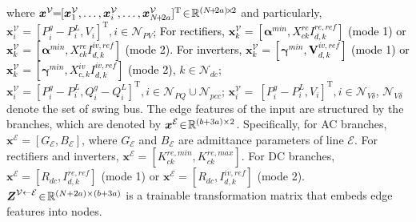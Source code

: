 \documentclass[lettersize,journal]{IEEEtran}
\begin{document}
where $\boldsymbol{x}^\mathcal{V}\! \!=\!\! [ \boldsymbol{x}^{\mathcal{V}}_1, \dots, \boldsymbol{x}^{\mathcal{V}}_i, \dots, \boldsymbol{x}^{\mathcal{V}}_{\textcolor{black}{N\!+\!2a}} ]^\mathrm{T} \! \in \! \mathbb{R}^{\textcolor{black}{(N\!+\!2a)} \! \times \! 2}$ and particularly, $ \boldsymbol{x}^{\mathcal{V}}_i \! = \! [ {P}^g_{i} \! - \! {P}^L_{i}, \! V_i ]^\mathrm{T}, i \! \in \! \mathcal{N}\!_{PV} $; \textcolor{black}{ For rectifiers, $\boldsymbol{x}_k^{\mathcal{V}} \! = \!  [\boldsymbol{\alpha}^{min},  {X}_{c k}^{re} {I}_{d,k}^{re,ref}  ]$ (mode 1) or $\boldsymbol{x}_k^{\mathcal{V}}\! = \! [\boldsymbol{\alpha}^{min}, {X}_{ck}^{re} {I}_{d,k}^{iv,ref}]$ (mode 2). For inverters, $\boldsymbol{x}_k^{\mathcal{V}} \! = \! [\boldsymbol{\gamma}^{min}, \boldsymbol{V}_{d,k}^{iv,ref} ]$ (mode 1) or $\boldsymbol{x}_k^{\mathcal{V}} \! = \! [\boldsymbol{\gamma}^{min}, {X}_{c,k}^{iv} {I}_{d,k}^{iv,ref}  ]$ (mode 2), } $k \! \in \! \mathcal{N}_{dc} $; $\boldsymbol{x}^{\mathcal{V}}_i= [{P}^g_{i}-{P}^L_{i}, {Q}^g_{i} \! - \! {Q}^L_{i}]^\mathrm{T}, i \! \in \! \mathcal{N}_{PQ} \cup \mathcal{N}_{pcc} $; $ \boldsymbol{x}^{\mathcal{V}}_i \! =  \! \ [{P}^g_{i} \! - \! {P}^L_{i}, V_{i}]^\mathrm{T}, i \in \mathcal{N}_{V \delta} $, $\mathcal{N}_{V \delta}$ denote the set of swing bus. The edge features of the input are structured by the branches, which are denoted by $\boldsymbol{x}^\mathcal{E} \! \in \! \mathbb{R}^{(\textcolor{black}{b}+3\textcolor{black}{a}) \times 2}$. Specifically, for AC branches, $\boldsymbol{x}^{\mathcal{E}}\!=\![ G_{\mathcal{E}}, B_{\mathcal{E}}] $, where $ G_{\mathcal{E}}$ and $ B_{\mathcal{E}}$ are admittance parameters of line $\mathcal{E}$. For rectifiers and  inverters, $\boldsymbol{x}^{\mathcal{E}} \! = \! [ K_{ck}^{re,min}, K_{ck}^{re,max} ]$. For DC branches, $\boldsymbol{x}^{\mathcal{E}}= [ {R}_{dc},  {I}_{d,k}^{re,ref} ]$ (mode 1) or $\boldsymbol{x}^{\mathcal{E}}= [ {R}_{dc},  {I}_{d,k}^{iv,ref}]$ (mode 2). $\boldsymbol{\textcolor{black}{Z}}^{\mathcal{V} \leftarrow \mathcal{E}} \! \in \! \mathbb{R}^{(N+2a) \times (\textcolor{black}{b}+3\textcolor{black}{a})} $ is a trainable transformation matrix that embeds edge features into nodes.
\end{document}

